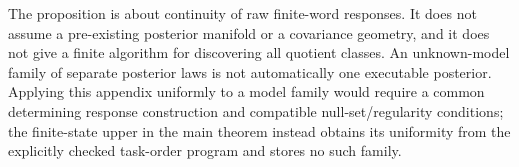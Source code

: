 The proposition is about continuity of raw finite-word responses. It does not assume a pre-existing posterior manifold or a covariance geometry, and it does not give a finite algorithm for discovering all quotient classes. An unknown-model family of separate posterior laws is not automatically one executable posterior. Applying this appendix uniformly to a model family would require a common determining response construction and compatible null-set/regularity conditions; the finite-state upper in the main theorem instead obtains its uniformity from the explicitly checked task-order program and stores no such family.
